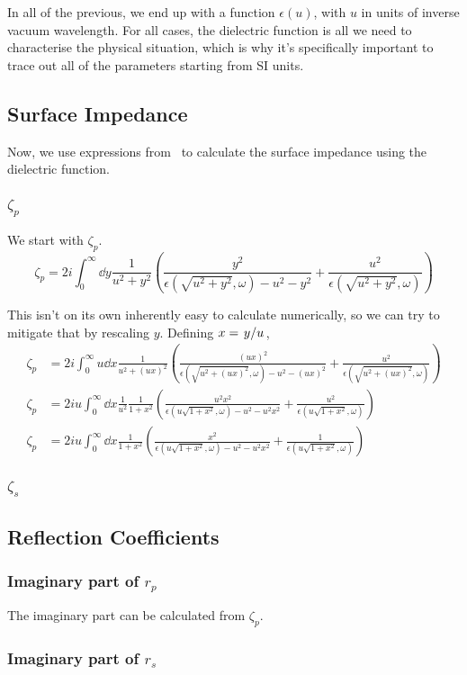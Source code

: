 \documentclass[../main.tex]{subfiles}
\begin{document}
	In all of the previous, we end up with a function $\epsilon(u)$, with $u$ in units of inverse vacuum wavelength.
	For all cases, the dielectric function is all we need to characterise the physical situation, which is why it's specifically important to trace out all of the parameters starting from SI units.

	\subsection{Surface Impedance} \label{subsec:nce:surfaceimpedance}
	Now, we use expressions from~\cite{Ford1984} to calculate the surface impedance using the dielectric function.

	\subsubsection{$\zeta_p$}
	We start with $\zeta_p$.
	\begin{equation}
		\zeta_p = 2i \int_0^\infty \dd{y} \frac{1}{u^2 + y^2} \left( \frac{y^2}{\epsilon(\sqrt{u^2 + y^2}, \omega) - u^2 - y^2} + \frac{u^2}{\epsilon(\sqrt{u^2 + y^2}, \omega)} \right)
	\end{equation}

	This isn't on its own inherently easy to calculate numerically, so we can try to mitigate that by rescaling $y$.
	Defining $x = \flatfrac{y}{u}$,
	\begin{align}
		\zeta_p &= 2i \int_0^\infty u \dd{x} \frac{1}{u^2 + (u x)^2} \left( \frac{(u x)^2}{\epsilon(\sqrt{u^2 + (u x)^2}, \omega) - u^2 - (u x)^2} + \frac{u^2}{\epsilon(\sqrt{u^2 + (u x)^2}, \omega)} \right) \\
		\zeta_p &= 2i u \int_0^\infty \dd{x} \frac{1}{u^2} \frac{1}{1 + x^2} \left( \frac{u^2 x^2}{\epsilon(u \sqrt{1 + x^2}, \omega) - u^2 - u^2 x^2} + \frac{u^2}{\epsilon(u \sqrt{1 + x^2}, \omega)} \right) \\
		\zeta_p &= 2i u \int_0^\infty \dd{x} \frac{1}{1 + x^2} \left( \frac{x^2}{\epsilon(u \sqrt{1 + x^2}, \omega) - u^2 - u^2 x^2} + \frac{1}{\epsilon(u \sqrt{1 + x^2}, \omega)} \right)
	\end{align}

	\subsubsection{$\zeta_s$}

	\subsection{Reflection Coefficients} \label{subsec:nce:reflectcoefs}
	\subsubsection{Imaginary part of $r_p$}
	The imaginary part can be calculated from $\zeta_p$.
	\subsubsection{Imaginary part of $r_s$}
\end{document}
